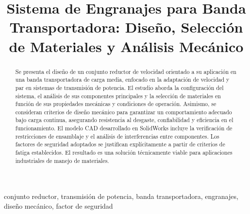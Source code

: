 \documentclass[conference]{IEEEtran}
\begin{document}
\title{Sistema de Engranajes para Banda Transportadora: Diseño,
Selección de Materiales y Análisis Mecánico}

\author{
}

\maketitle

\begin{abstract}
Se presenta el diseño de un conjunto reductor de velocidad orientado a su aplicación en
una banda transportadora de carga media, enfocado en la adaptación de velocidad y par en
sistemas de transmisión de potencia. El estudio aborda la configuración del sistema, el
análisis de sus componentes principales y la selección de materiales en función de sus
propiedades mecánicas y condiciones de operación. Asimismo, se consideran criterios de
diseño mecánico para garantizar un comportamiento adecuado bajo carga continua,
asegurando resistencia al desgaste, confiabilidad y eficiencia en el funcionamiento. El
modelo CAD desarrollado en SolidWorks incluye la verificación de restricciones de
ensamblaje y el análisis de interferencias entre componentes. Los factores de seguridad
adoptados se justifican explícitamente a partir de criterios de fatiga establecidos. El
resultado es una solución técnicamente viable para aplicaciones industriales de manejo
de materiales.
\end{abstract}

\begin{IEEEkeywords}
conjunto reductor, transmisión de potencia, banda transportadora, engranajes, diseño
mecánico, factor de seguridad
\end{IEEEkeywords}
\end{document}
